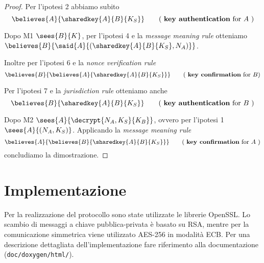 \documentclass[a4paper]{article}
\begin{document}
\begin{proof}
Per l'ipotesi 2 abbiamo subito
\[
\believes{A}{ \sharedkey{A}{B}{K_S} }  \tag{ {\bf key authentication} for $A$ }
\]

Dopo M1 $\sees{B}{K}$, per l'ipotesi 4 e la {\em message meaning rule} otteniamo $ \believes{B}{ \said{A}{( \sharedkey{A}{B}{K_S}, N_A )} } $.

Inoltre per l'ipotesi 6 e la {\em nonce verification rule}
\[
\believes{B}{ \believes{A}{ \sharedkey{A}{B}{K_S} } }   \tag{ {\bf key confirmation} for $B$}
\]

Per l'ipotesi 7 e la {\em jurisdiction rule} otteniamo anche
\[
\believes{B}{ \sharedkey{A}{B}{K_S} } \tag{ {\bf key authentication} for $B$ }
\]

Dopo M2 $\sees{A}{ \decrypt{N_A,K_S}{K_B} }$, ovvero per l'ipotesi 1 $\sees{A}{ (N_A,K_S) }$. Applicando la {\em message meaning rule}
\[
\believes{A}{ \believes{B}{ \sharedkey{A}{B}{K_S} } } \tag{ {\bf key confirmation} for $A$ }
\]
concludiamo la dimostrazione.
\end{proof}


\section{Implementazione}
Per la realizzazione del protocollo sono state utilizzate le librerie OpenSSL. Lo scambio di messaggi a chiave pubblica-privata è basato su RSA, mentre per la comunicazione simmetrica viene utilizzato AES-256 in modalità ECB. Per una descrizione dettagliata dell'implementazione fare riferimento alla documentazione ({\tt doc/doxygen/html/}).
\end{document}
